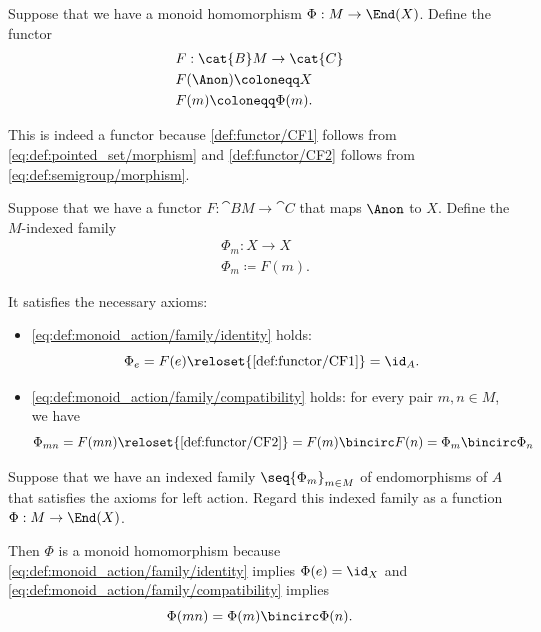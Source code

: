 \begin{defproof}
   Suppose that we have a monoid homomorphism \( \Phi: M \to \End(X) \). Define the functor
  \begin{equation*}
    \begin{aligned}
      &F: \cat{B} M \to \cat{C} \\
      &F(\Anon) \coloneqq X \\
      &F(m) \coloneqq \Phi(m).
    \end{aligned}
  \end{equation*}

  This is indeed a functor because \ref{def:functor/CF1} follows from \eqref{eq:def:pointed_set/morphism} and \ref{def:functor/CF2} follows from \eqref{eq:def:semigroup/morphism}.

   Suppose that we have a functor \( F: \cat{B} M \to \cat{C} \) that maps \( \Anon \) to \( X \). Define the \( M \)-indexed family
  \begin{equation*}
    \begin{aligned}
      &\Phi_m: X \to X \\
      &\Phi_m \coloneqq F(m).
    \end{aligned}
  \end{equation*}

  It satisfies the necessary axioms:
  \begin{itemize}
    \item \ref{eq:def:monoid_action/family/identity} holds:
    \begin{equation*}
      \Phi_e
      =
      F(e)
      \reloset {\ref{def:functor/CF1}} =
      \id_A.
    \end{equation*}

    \item \ref{eq:def:monoid_action/family/compatibility} holds: for every pair \( m, n \in M \), we have
    \begin{equation*}
      \Phi_{mn}
      =
      F(mn)
      \reloset {\ref{def:functor/CF2}} =
      F(m) \bincirc F(n)
      =
      \Phi_m \bincirc \Phi_n
    \end{equation*}
  \end{itemize}

   Suppose that we have an indexed family \( \seq{ \Phi_m }_{m \in M} \) of endomorphisms of \( A \) that satisfies the axioms for left action. Regard this indexed family as a function \( \Phi: M \to \End(X) \).

  Then \( \Phi \) is a monoid homomorphism because \ref{eq:def:monoid_action/family/identity} implies \( \Phi(e) = \id_X \) and \eqref{eq:def:monoid_action/family/compatibility} implies
  \begin{equation*}
    \Phi(mn) = \Phi(m) \bincirc \Phi(n).
  \end{equation*}
\end{defproof}

